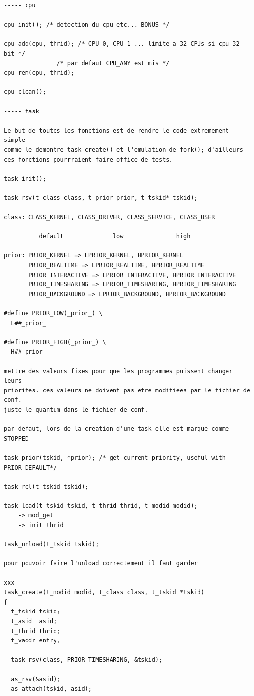 \documentclass[10pt,a4wide]{article}
\begin{document}
\begin{verbatim}
----- cpu

cpu_init(); /* detection du cpu etc... BONUS */

cpu_add(cpu, thrid); /* CPU_0, CPU_1 ... limite a 32 CPUs si cpu 32-bit */
			   /* par defaut CPU_ANY est mis */
cpu_rem(cpu, thrid);

cpu_clean();

----- task

Le but de toutes les fonctions est de rendre le code extremement simple
comme le demontre task_create() et l'emulation de fork(); d'ailleurs
ces fonctions pourrraient faire office de tests.

task_init();

task_rsv(t_class class, t_prior prior, t_tskid* tskid);

class: CLASS_KERNEL, CLASS_DRIVER, CLASS_SERVICE, CLASS_USER

          default              low               high

prior: PRIOR_KERNEL => LPRIOR_KERNEL, HPRIOR_KERNEL
       PRIOR_REALTIME => LPRIOR_REALTIME, HPRIOR_REALTIME
       PRIOR_INTERACTIVE => LPRIOR_INTERACTIVE, HPRIOR_INTERACTIVE
       PRIOR_TIMESHARING => LPRIOR_TIMESHARING, HPRIOR_TIMESHARING
       PRIOR_BACKGROUND => LPRIOR_BACKGROUND, HPRIOR_BACKGROUND

#define PRIOR_LOW(_prior_) \
  L##_prior_

#define PRIOR_HIGH(_prior_) \
  H##_prior_

mettre des valeurs fixes pour que les programmes puissent changer leurs
priorites. ces valeurs ne doivent pas etre modifiees par le fichier de conf.
juste le quantum dans le fichier de conf.

par defaut, lors de la creation d'une task elle est marque comme STOPPED

task_prior(tskid, *prior); /* get current priority, useful with PRIOR_DEFAULT*/

task_rel(t_tskid tskid);

task_load(t_tskid tskid, t_thrid thrid, t_modid modid);
	-> mod_get
	-> init thrid

task_unload(t_tskid tskid);

pour pouvoir faire l'unload correctement il faut garder

XXX
task_create(t_modid modid, t_class class, t_tskid *tskid)
{
  t_tskid tskid;
  t_asid  asid;
  t_thrid thrid;
  t_vaddr entry;

  task_rsv(class, PRIOR_TIMESHARING, &tskid);

  as_rsv(&asid);
  as_attach(tskid, asid);


\end{verbatim}
\end{document}
